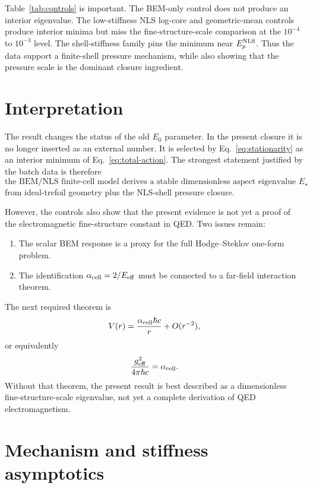 \documentclass[11pt]{article}
\newcommand{\Estar}{E_\star}
\newcommand{\Eeff}{E_{\rm eff}}
\newcommand{\alphacell}{\alpha_{\rm cell}}
\begin{document}
Table~\ref{tab:controls} is important. The BEM-only control does not produce an interior eigenvalue. The low-stiffness NLS log-core and geometric-mean controls produce interior minima but miss the fine-structure-scale comparison at the \(10^{-4}\) to \(10^{-3}\) level. The shell-stiffness family pins the minimum near \(E_p^{\rm NLS}\). Thus the data support a finite-shell pressure mechanism, while also showing that the pressure scale is the dominant closure ingredient.

\section{Interpretation}

The result changes the status of the old \(E_0\) parameter. In the present closure it is no longer inserted as an external number. It is selected by Eq.~\eqref{eq:stationarity} as an interior minimum of Eq.~\eqref{eq:total-action}. The strongest statement justified by the batch data is therefore
\[
\boxed{
\text{the BEM/NLS finite-cell model derives a stable dimensionless aspect eigenvalue }\Estar
}
\]
from ideal-trefoil geometry plus the NLS-shell pressure closure.

However, the controls also show that the present evidence is not yet a proof of the electromagnetic fine-structure constant in QED. Two issues remain:
\begin{enumerate}[label=(\roman*)]
\item The scalar BEM response is a proxy for the full Hodge--Steklov one-form problem.
\item The identification \(\alphacell=2/\Eeff\) must be connected to a far-field interaction theorem.
\end{enumerate}
The next required theorem is
\[
V(r)=\frac{\alphacell\hbar c}{r}+O(r^{-2}),
\]
or equivalently
\[
\frac{g_{\rm eff}^2}{4\pi\hbar c}=\alphacell.
\]
Without that theorem, the present result is best described as a dimensionless fine-structure-scale eigenvalue, not yet a complete derivation of QED electromagnetism.



\section{Mechanism and stiffness asymptotics}
\label{sec:kappa-asymptotics}
\end{document}
